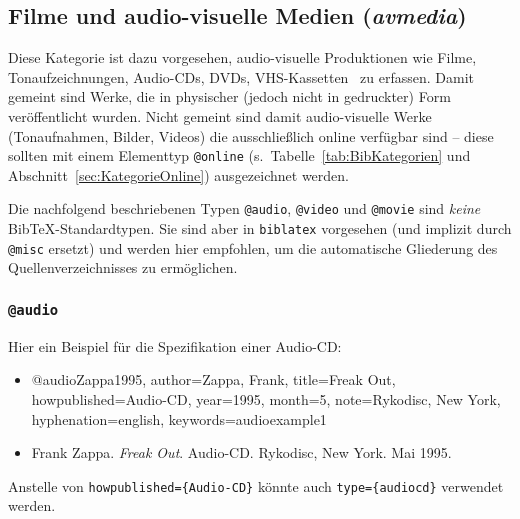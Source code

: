 \subsection{Filme und audio-visuelle Medien (\emph{avmedia})}
\label{sec:KategorieAvmedia}

Diese Kategorie ist dazu vorgesehen, audio-visuelle Produktionen wie Filme, 
Tonaufzeichnungen, Audio-CDs, DVDs, VHS-Kassetten \usw\ zu erfassen.
Damit gemeint sind Werke, die in physischer (jedoch nicht in gedruckter) Form
veröffentlicht wurden.
Nicht gemeint sind damit audio-visuelle Werke (Tonaufnahmen, Bilder, Videos) 
die ausschließlich online verfügbar sind -- diese sollten mit einem Elementtyp 
\texttt{@online} (s.\ Tabelle~\ref{tab:BibKategorien} und Abschnitt~\ref{sec:KategorieOnline}) ausgezeichnet werden.

Die nachfolgend beschriebenen Typen \texttt{@audio}, \texttt{@video} und \texttt{@movie} 
sind \emph{keine} BibTeX-Standardtypen. Sie sind aber in \texttt{biblatex} vorgesehen
(und implizit durch \texttt{@misc} ersetzt) und werden hier empfohlen, um die automatische 
Gliederung des Quellenverzeichnisses zu ermöglichen.

\subsubsection{\texttt{@audio}}
\label{sec:@audio}
Hier ein Beispiel für die Spezifikation einer Audio-CD:
%
\begin{itemize}
\item[] 
\begin{GenericCode}[numbers=none]
@audio{Zappa1995,
  author={Zappa, Frank},
  title={Freak Out},
  howpublished={Audio-CD},
  year={1995},
  month={5},
  note={Rykodisc, New York},
  hyphenation={english},
  keywords={audioexample1}
}
\end{GenericCode}
\item[\cite{Zappa1995}]
Frank Zappa. \textit{Freak Out}. Audio-CD. Rykodisc, New York. Mai 1995.
\end{itemize}
%
Anstelle von \verb!howpublished={Audio-CD}! könnte auch 
\verb!type={audiocd}! verwendet werden.


